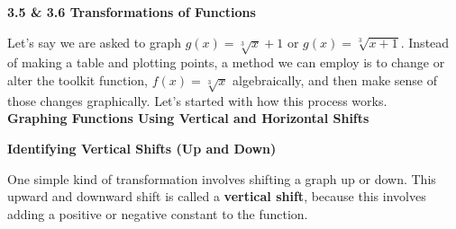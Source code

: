 \documentclass[12pt]{book}
\begin{document}
\begin{comment}
Name: \underline{\hspace{100mm}}
\vspace{20mm}
  \centerline{\Large \textbf{Chapter 2: Equations and Inequalities} } 

{\large
\begin{center}
\begin{varwidth}{\textwidth}
\begin{enumerate}[2.1]
    \item The Regular Coordinate System and Graphs
    \item Linear Equations in One Variable
    \item Models and  Applications (Skipping)
    \item Complex Numbers
    \item Quadratic Equations
    \item Other Types of Equations
    \item Linear Inequalities and Absolute Value Inequalities
\end{enumerate}
\end{varwidth}
\end{center}

}
\newpage  
\end{comment}

\textbf{{\Large 3.5 \& 3.6 Transformations of Functions}}
\vspace{3mm}

Let's say we are asked to graph $g(x)=\sqrt[3]{x}+1$ or $g(x)= \sqrt[3]{x+1}$. Instead of making a table and plotting points, a method we can employ is to change or alter the toolkit function, $f(x)=\sqrt[3]{x}$ algebraically, and then make sense of those changes graphically. Let's started with how this process works.
\\

{ \large \textbf{Graphing Functions Using Vertical and Horizontal Shifts}}
\vspace{3mm}

\textbf{Identifying Vertical Shifts (Up and Down)}

One simple kind of transformation involves shifting a graph up or down. This upward and downward shift is called a \textbf{vertical shift}, because this involves adding a positive or negative constant to the function. 
\\
\end{document}
